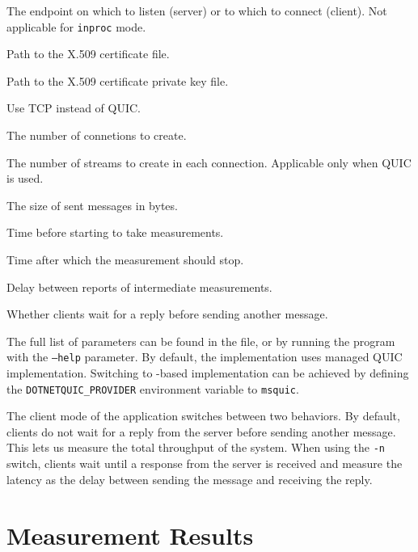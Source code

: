 \begin{description}

     The endpoint on which to listen (server) or to which to connect
(client). Not applicable for \texttt{inproc} mode.

     Path to the X.509 certificate file.

     Path to the X.509 certificate private key file.

     Use TCP instead of QUIC\@.

     The number of connetions to create.

     The number of streams to create in each connection. Applicable
only when QUIC is used.

     The size of sent messages in bytes.

     Time before starting to take measurements.

     Time after which the measurement should stop.

     Delay between reports of intermediate measurements.

     Whether clients wait for a reply before sending another message.

\end{description}

The full list of parameters can be found in the  file, or by running the
program with the \texttt{--help} parameter. By default, the implementation uses managed QUIC
implementation. Switching to \libmsquic{}-based implementation can be achieved by defining the
\texttt{DOTNETQUIC_PROVIDER} environment variable to \texttt{msquic}.

The client mode of the application switches between two behaviors. By default, clients do not wait
for a reply from the server before sending another message. This lets us measure the total
throughput of the system. When using the \texttt{-n} switch, clients wait until a response from the
server is received and measure the latency as the delay between sending the message and receiving
the reply.

\section{Measurement Results}\label{sec:04-perf-results}


